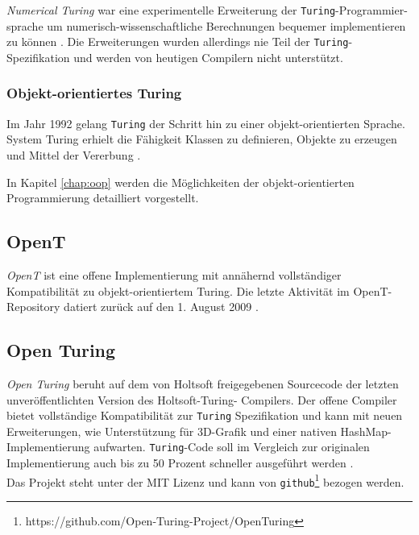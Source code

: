{\em Numerical Turing} war eine experimentelle Erweiterung der \texttt{Turing}-Programmier-sprache um numerisch-wissenschaftliche Berechnungen bequemer implementieren zu k\"onnen \cite{Hull:85}. Die Erweiterungen wurden allerdings nie Teil der \texttt{Turing}- Spezifikation und werden von heutigen Compilern nicht unterst\"utzt.

\subsubsection{Objekt-orientiertes Turing}

Im Jahr 1992 gelang \texttt{Turing} der Schritt hin zu einer objekt-orientierten Sprache. System Turing erhielt die F\"ahigkeit Klassen zu definieren, Objekte zu erzeugen und Mittel der Vererbung \cite{Hume:01}.

In Kapitel \ref{chap:oop} werden die M\"oglichkeiten der objekt-orientierten Programmierung detailliert vorgestellt.

\subsection{OpenT}

{\em OpenT} ist eine offene Implementierung mit ann\"ahernd vollst\"andiger Kompatibilit\"at zu objekt-orientiertem Turing. Die letzte Aktivit\"at im OpenT-Repository datiert zur\"uck auf den 1. August 2009 \cite{www:opent}.

\subsection{Open Turing}

{\em Open Turing} beruht auf dem von Holtsoft freigegebenen Sourcecode der letzten unver\"offentlichten Version des Holtsoft-Turing- Compilers. Der offene Compiler bietet vollst\"andige Kompatibilit\"at zur \texttt{Turing} Spezifikation und kann mit neuen Erweiterungen, wie Unterst\"utzung f\"ur 3D-Grafik und einer nativen HashMap-Implementierung aufwarten. \texttt{Turing}-Code soll im Vergleich zur originalen Implementierung auch bis zu 50 Prozent schneller ausgef\"uhrt werden \cite{www:ot}. \\
Das Projekt steht unter der MIT Lizenz und kann von \texttt{github}\footnote{https://github.com/Open-Turing-Project/OpenTuring} bezogen werden. 


